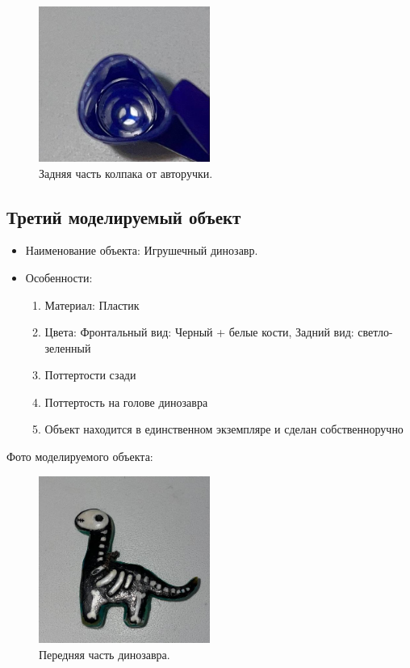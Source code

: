 \documentclass[areasetadvanced]{scrartcl}
\begin{document}
\begin{figure}[H]
    \centering
    \includegraphics[width=0.5\textwidth]{KolpakBottom.png}
    \caption{Задняя часть колпака от авторучки.}
    \label{fig:syntdiag}
\end{figure}
\subsection{Третий моделируемый объект}
\begin{itemize}
    \item Наименование объекта: Игрушечный динозавр.
	\item Особенности: \begin{enumerate}
        \item Материал: Пластик
        \item Цвета: Фронтальный вид: Черный + белые кости, Задний вид: светло-зеленный
        \item Поттертости сзади
        \item Поттертость на голове динозавра
        \item Объект находится в единственном экземпляре и сделан собственноручно
    \end{enumerate}
\end{itemize}
Фото моделируемого объекта:
\begin{figure}[H]
    \centering
    \includegraphics[width=0.5\textwidth]{DinoFront.png}
    \caption{Передняя часть динозавра.}
    \label{fig:syntdiag}
\end{figure}
\end{document}
